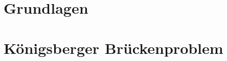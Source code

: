 \documentclass[hyperref={pdfpagelabels=false},usepdftitle=false]{beamer}
\begin{document}

\title{\titleText}
\subtitle{}
\author{\tutor}
\date{2. Juli 2013}
\subject{Diskrete Mathematik}

\frame{\titlepage}



\section{Grundlagen}


\section{Königsberger Brückenproblem}

\end{document}

